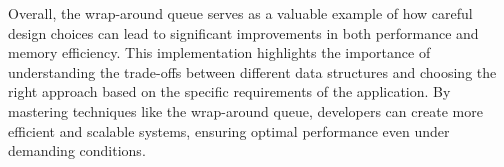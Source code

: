 Overall, the wrap-around queue serves as a valuable example of how careful design choices can lead to significant improvements in both performance and memory efficiency. This implementation highlights the importance of understanding the trade-offs between different data structures and choosing the right approach based on the specific requirements of the application. By mastering techniques like the wrap-around queue, developers can create more efficient and scalable systems, ensuring optimal performance even under demanding conditions.
